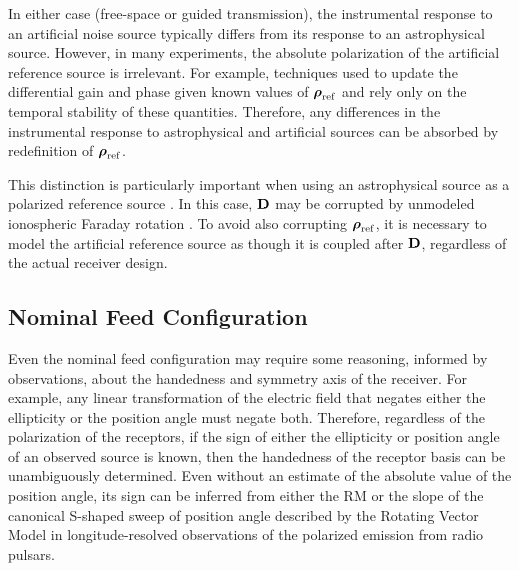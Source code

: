 In either case (free-space or guided transmission), the instrumental response to an artificial noise source typically differs from its response to an astrophysical source.
%
However, in many experiments, the absolute polarization of the artificial reference source is irrelevant.
%
For example, techniques used to update the differential gain and phase given known values of $\mbox{\boldmath $\rho$}_\mathrm{ref}$ and  \citep[e.g.,][]{ovhb04} rely only on the temporal stability of these quantities.
%
Therefore, any differences in the instrumental response to astrophysical and artificial sources can be absorbed by redefinition of $\mbox{\boldmath $\rho$}_\mathrm{ref}$.

This distinction is particularly important when using an astrophysical source as a polarized reference source \citep[e.g.,][]{van13}.  In this case, ${\bf D}$ may be corrupted by unmodeled ionospheric Faraday rotation \cite[e.g.,][]{rvg+24}.
%
To avoid also corrupting $\mbox{\boldmath $\rho$}_\mathrm{ref}$, it is necessary to model the artificial reference source as though it is coupled after ${\bf D}$, regardless of the actual receiver design.


\subsection{ Nominal Feed Configuration }
\label{sec:calibration_configuration}

Even the nominal feed configuration may require some reasoning, informed by observations, about the handedness and symmetry axis of the receiver.
%
For example, any linear transformation of the electric field that negates either the ellipticity or the position angle must negate both.
%
Therefore, regardless of the polarization of the receptors, if the sign of either the ellipticity or position angle of an observed source is known, then the handedness of the receptor basis can be unambiguously determined.
%
Even without an estimate of the absolute value of the position angle, its sign can be inferred from either the RM or the slope of the canonical S-shaped sweep of position angle described by the Rotating Vector Model \citep[RVM;][]{rc69a} in longitude-resolved observations of the polarized emission from radio pulsars.



